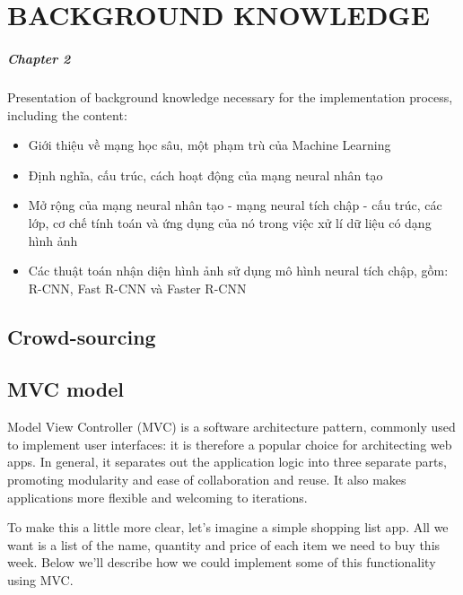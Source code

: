 \chapter{BACKGROUND KNOWLEDGE}
\label{chap:background}

\paragraph{Chapter 2} Presentation of background knowledge necessary for the implementation process, including the content:


\begin{itemize}
\item Giới thiệu về mạng học sâu, một phạm trù của Machine Learning

\item Định nghĩa, cấu trúc, cách hoạt động của mạng neural nhân tạo

\item Mở rộng của mạng neural nhân tạo - mạng neural tích chập - cấu trúc, các lớp, cơ chế tính toán và ứng dụng của nó trong việc xử lí dữ liệu có dạng hình ảnh

\item Các thuật toán nhận diện hình ảnh sử dụng mô hình neural tích chập, gồm: R-CNN, Fast R-CNN và Faster R-CNN
\end{itemize}

\section{Crowd-sourcing}

\section{MVC model}
Model View Controller (MVC) is a software architecture pattern, commonly used to implement user interfaces: it is therefore a popular choice for architecting web apps. In general, it separates out the application logic into three separate parts, promoting modularity and ease of collaboration and reuse. It also makes applications more flexible and welcoming to iterations.

To make this a little more clear, let's imagine a simple shopping list app. All we want is a list of the name, quantity and price of each item we need to buy this week. Below we'll describe how we could implement some of this functionality using MVC.

